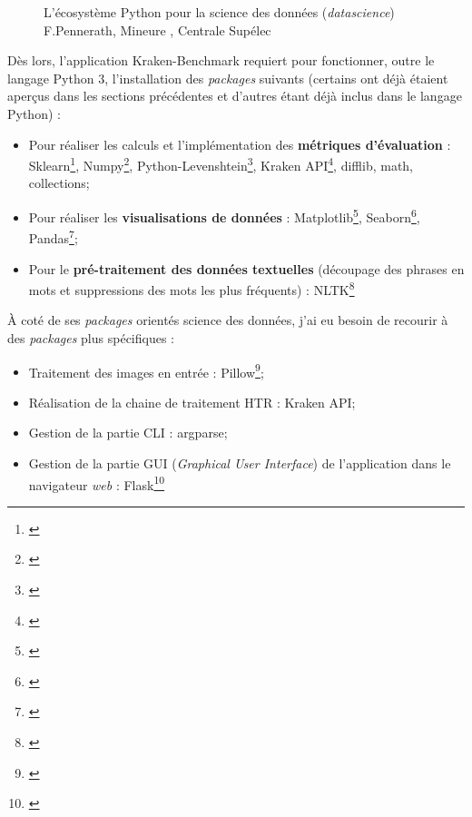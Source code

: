 \begin{figure}[h!]
    \centering
    \centerline{}
    \caption{L'écosystème Python pour la science des données (\textit{datascience})   \textcopyright F.Pennerath, Mineure , Centrale Supélec}
    \label{fig:eco_datascience}
\end{figure}

Dès lors, l'application Kraken-Benchmark requiert pour fonctionner, outre le langage Python 3, l'installation des \textit{packages} suivants (certains ont déjà étaient aperçus dans les sections précédentes et d'autres étant déjà inclus dans le langage Python) : 

\begin{itemize}
    \item Pour réaliser les calculs et l'implémentation des \textbf{métriques d'évaluation} : Sklearn\footnote{\cite{noauthor_scikit-learn_nodate}}, Numpy\footnote{\cite{noauthor_numpy_nodate}}, Python-Levenshtein\footnote{\cite{noauthor_python-levenshtein_nodate}}, Kraken API\footnote{\cite{noauthor_kraken_nodate}}, difflib, math, collections;
    \item Pour réaliser les \textbf{visualisations de données} : Matplotlib\footnote{\cite{noauthor_matplotlib_nodate}}, Seaborn\footnote{\cite{noauthor_seaborn_nodate}}, Pandas\footnote{\cite{noauthor_pandas_nodate}};
    \item Pour le \textbf{pré-traitement des données textuelles} (découpage des phrases en mots et suppressions des mots les plus fréquents) : NLTK\footnote{\cite{noauthor_nltk_nodate}}
\end{itemize}

À coté de ses \textit{packages} orientés science des données, j'ai eu besoin de recourir à des \textit{packages} plus spécifiques : 

\begin{itemize}
    \item Traitement des images en entrée : Pillow\footnote{\cite{noauthor_pillow_nodate}};
    \item Réalisation de la chaine de traitement HTR : Kraken API;
    \item Gestion de la partie CLI : argparse;
    \item Gestion de la partie GUI (\textit{Graphical User Interface}) de l'application dans le navigateur \textit{web} : Flask\footnote{\cite{noauthor_flask_nodate}}
\end{itemize}

